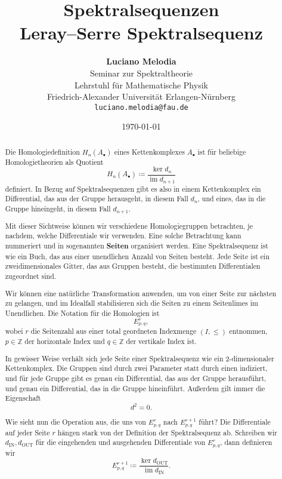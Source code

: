 \documentclass[12pt]{article}
\title{\textbf{Spektralsequenzen\\ Leray–Serre Spektralsequenz}}
\author{ \textbf{Luciano Melodia} \\ Seminar zur Spektraltheorie \\ Lehrstuhl
für Mathematische Physik \\ Friedrich-Alexander Universität Erlangen-Nürnberg \\
\texttt{luciano.melodia@fau.de}}
\date{\today}
\numberwithin{conj}{section}
\begin{document}
    \hypersetup{bookmarksnumbered=true,}
    \maketitle

    \begin{abstract}
        Die Homologiedefinition $H_{n}(A_{\bullet})$ eines Kettenkomplexes $A_\bullet$ ist für beliebige
        Homologietheorien als Quotient
        \[
            H_{n}(A_{\bullet}) \coloneq \frac{\ker d_{n}}{\operatorname{im}d_{n+1}}
        \]
        definiert. In Bezug auf Spektralsequenzen gibt es also in einem
        Kettenkomplex ein Differential, das aus der Gruppe herausgeht, in diesem
        Fall $d_{n}$, und eines, das in die Gruppe hineingeht, in diesem Fall $d_{n+1}$.

        Mit dieser Sichtweise können wir verschiedene Homologiegruppen betrachten,
        je nachdem, welche Differentiale wir verwenden. Eine solche Betrachtung kann
        nummeriert und in sogenannten \textbf{Seiten} organisiert werden. Eine
        Spektralsequenz ist wie ein Buch, das aus einer unendlichen Anzahl von Seiten
        besteht. Jede Seite ist ein zweidimensionales Gitter, das aus Gruppen besteht,
        die bestimmten Differentialen zugeordnet sind.

        Wir können eine natürliche Transformation anwenden, um von einer Seite zur nächsten
        zu gelangen, und im Idealfall stabilisieren sich die Seiten zu einem
        Seitenlimes im Unendlichen. Die Notation für die Homologien ist
        \[
            E^{r}_{p,q},
        \]
        wobei $r$ die Seitenzahl aus einer total geordneten Indexmenge $(I,\leq)$ entnommen,
        $p \in \mathbb{Z}$ der horizontale Index und $q \in \mathbb{Z}$ der
        vertikale Index ist.

        In gewisser Weise verhält sich jede Seite einer Spektralsequenz wie ein $2$-dimensionaler
        Kettenkomplex. Die Gruppen sind durch zwei Parameter statt durch einen indiziert,
        und für jede Gruppe gibt es genau ein Differential, das aus der Gruppe herausführt,
        und genau ein Differential, das in die Gruppe hineinführt. Außerdem gilt
        immer die Eigenschaft
        \[
            d^{2} = 0.
        \]

        Wie sieht nun die Operation aus, die uns von $E^{r}_{p,q}$ nach
        $E^{r+1}_{p,q}$ führt? Die Differentiale auf jeder Seite $r$ hängen stark von
        der Definition der Spektralsequenz ab. Schreiben wir
        $d_{\operatorname{IN}}, d_{\operatorname{OUT}}$ für die eingehenden und
        ausgehenden Differentiale von $E^{r}_{p,q}$, dann definieren wir
        \[
            E^{r+1}_{p,q}\coloneq \frac{\ker d_{\operatorname{OUT}}}{\operatorname{im}d_{\operatorname{IN}}}
            .
        \]


\end{abstract}
\end{document}
